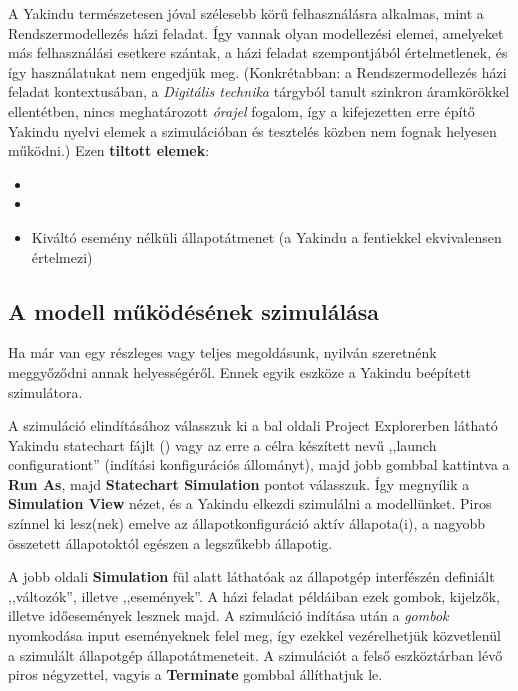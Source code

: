 A Yakindu természetesen jóval szélesebb körű felhasználásra alkalmas, mint a Rendszermodellezés házi feladat. Így vannak olyan modellezési elemei, amelyeket más felhasználási esetkere szántak, a házi feladat szempontjából értelmetlenek, és így használatukat nem engedjük meg. (Konkrétabban: a Rendszermodellezés házi feladat kontextusában, a \emph{Digitális technika} tárgyból tanult szinkron áramkörökkel ellentétben, nincs meghatározott \emph{órajel} fogalom, így a kifejezetten erre építő Yakindu nyelvi elemek a szimulációban és tesztelés közben nem fognak helyesen működni.) Ezen \textbf{tiltott elemek}:

\begin{itemize}
	\item {}
	\item {}
	\item Kiváltó esemény nélküli állapotátmenet (a Yakindu a fentiekkel ekvivalensen értelmezi)
\end{itemize}

\begin{comment}
A \emph{default} ablakrészben tudjuk megadni az interface-eket, illetve a modellezéshez szükséges alapokat. A jobb oldali eszköztárral tudunk hozzáadni az ábrához újabb állapotokat, illetve onnan érünk el mindent, ami a modellezéshez szükséges.
\end{comment}


\subsection{A modell működésének szimulálása}
Ha már van egy részleges vagy teljes megoldásunk, nyilván szeretnénk meggyőződni annak helyességéről. Ennek egyik eszköze a Yakindu beépített szimulátora.

A szimuláció elindításához válasszuk ki a bal oldali Project Explorerben látható Yakindu statechart fájlt () vagy az erre a célra készített  nevű ,,launch configurationt'' (indítási konfigurációs állományt), majd jobb gombbal kattintva a \textbf{Run As}, majd \textbf{Statechart Simulation} pontot válasszuk. Így megnyílik a \textbf{Simulation View} nézet, és a Yakindu elkezdi szimulálni a modellünket. Piros színnel ki lesz(nek) emelve az állapotkonfiguráció aktív állapota(i), a nagyobb összetett állapotoktól egészen a legszűkebb állapotig.

A jobb oldali \textbf{Simulation} fül alatt láthatóak az állapotgép interfészén definiált ,,változók'', illetve ,,események''. A házi feladat példáiban ezek gombok, kijelzők, illetve időesemények lesznek majd. A szimuláció indítása után a \emph{gombok} nyomkodása input eseményeknek felel meg, így ezekkel vezérelhetjük közvetlenül a szimulált állapotgép állapotátmeneteit. A szimulációt a felső eszköztárban lévő piros négyzettel, vagyis a \textbf{Terminate} gombbal állíthatjuk le.


